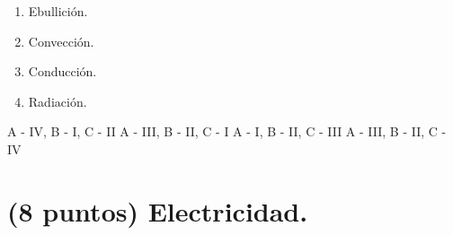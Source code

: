 \documentclass[12pt, letter]{exam}
\begin{document}
\begin{questions}
\begin{figure}[H]
    \end{figure}
    \begin{multicols}{4}
    \begin{enumerate}[label=\Roman*)]
        \item Ebullición.
        \item Convección.
        \item Conducción.
        \item Radiación.
    \end{enumerate}
    \end{multicols}
    \begin{tasks}
        \task A - IV, B - I, C - II
        \task A - III, B - II, C - I
        \task A - I, B - II, C - III
        \task A - III, B - II, C - IV
    \end{tasks}

    \section{(8 puntos) Electricidad.}


\end{questions}
\end{document}
